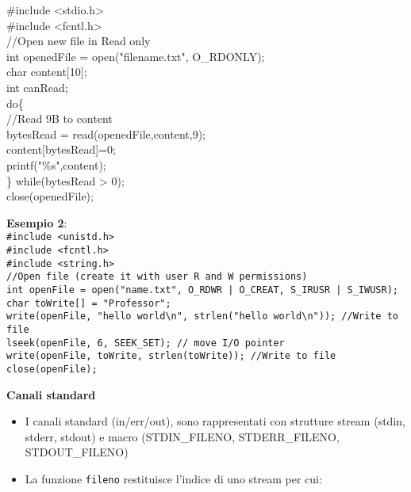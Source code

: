 \begin{flushleft}
\begin{itemize}
\begin{flushleft}
{            \#include <stdio.h>\\
            \#include <fcntl.h>\\
            //Open new file in Read only\\
            int openedFile = open("filename.txt", O\_RDONLY);\\
            char content[10]; \\
            int canRead;\\
            do\{\\
            \tab //Read 9B to content\\
            \tab bytesRead = read(openedFile,content,9);\\
            \tab content[bytesRead]=0;\\
            \tab printf("\%s",content);\\
            \} while(bytesRead > 0);\\
            close(openedFile); }
          \end{flushleft}
          \begin{flushleft}
            \textbf{Esempio 2}:\\
            \texttt{\#include <unistd.h>\\
            \#include <fcntl.h>\\
            \#include <string.h>\\
            //Open file (create it with user R and W permissions)\\
            int openFile = open("name.txt", O\_RDWR | O\_CREAT, S\_IRUSR | S\_IWUSR);\\
            char toWrite[] = "Professor";\\
            write(openFile, "hello world\textbackslash n", strlen("hello world\textbackslash n")); //Write to file\\
            lseek(openFile, 6, SEEK\_SET); // move I/O pointer\\
            write(openFile, toWrite, strlen(toWrite)); //Write to file\\
            close(openFile); } 
          \end{flushleft}
  \end{itemize}
  \textbf{Canali standard}
  \begin{itemize}
    \item I canali standard (in/err/out), sono rappresentati con strutture stream (stdin, stderr, stdout) e macro 
          (STDIN\_FILENO, STDERR\_FILENO, STDOUT\_FILENO)
    \item La funzione \texttt{fileno} restituisce l'indice di uno stream per cui:

\end{itemize}
\end{flushleft}
